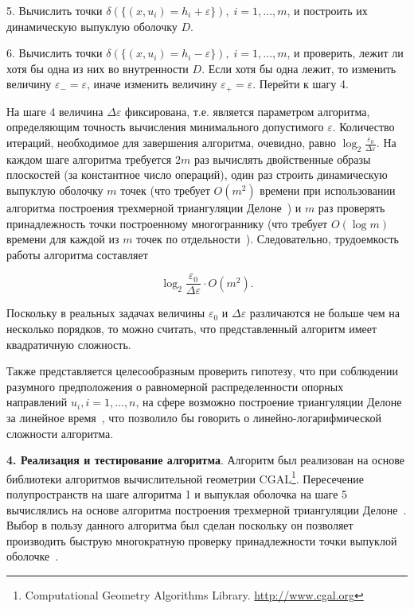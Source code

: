 \documentclass[a4paper, 11pt]{article}
\theoremstyle{MyDefinitionStyle}
\theoremstyle{MyTheoremStyle}
\begin{document}
5. Вычислить точки
 $\delta(\{(x, u_{i}) = h_{i} + \varepsilon\}), \; i = 1, \ldots, m$, и построить
 их динамическую выпуклую оболочку $D$.

6. Вычислить точки
 $\delta(\{(x, u_{i}) = h_{i} - \varepsilon\}), \; i = 1, \ldots, m$, и
 проверить, лежит ли хотя бы одна из них во внутренности $D$. Если хотя бы одна
 лежит, то изменить величину $\varepsilon_{-} = \varepsilon$, иначе изменить
 величину $\varepsilon_{+} = \varepsilon$. Перейти к шагу 4.


На шаге 4 величина $\Delta \varepsilon$ фиксирована, т.е. является
параметром алгоритма, определяющим точность вычисления минимального допустимого
$\varepsilon$. Количество итераций, необходимое для завершения алгоритма,
очевидно, равно $\log_{2} \frac{\varepsilon_{0}}{\Delta \varepsilon}$. На каждом
шаге алгоритма требуется $2m$ раз вычислять двойственные образы плоскостей (за
константное число операций), один раз строить динамическую выпуклую оболочку
$m$ точек (что требует $O(m^2)$ времени при использовании алгоритма
построения трехмерной триангуляции Делоне~\cite{Devillers}) и $m$ раз проверять
принадлежность точки построенному многограннику (что требует $O(\log m)$
времени для каждой из $m$ точек по отдельности~\cite{Devillers}).
Следовательно, трудоемкость работы алгоритма составляет

\begin{equation*}
 \log_{2} \frac{\varepsilon_{0}}{\Delta \varepsilon} \cdot O(m^2).
\end{equation*}

Поскольку в реальных задачах величины $\varepsilon_{0}$ и
$\Delta \varepsilon$ различаются не больше чем на несколько порядков, то
можно считать, что представленный алгоритм имеет квадратичную сложность.

Также представляется целесообразным проверить гипотезу, что при соблюдении
разумного предположения о равномерной распределенности опорных направлений
$u_i, i = 1, \ldots, n$, на сфере возможно построение триангуляции Делоне
за линейное время~\cite{Attali}, что позволило бы говорить о
линейно-логарифмической сложности алгоритма.

\textbf{4. Реализация и тестирование алгоритма}.
Алгоритм был реализован на основе библиотеки алгоритмов вычислительной
геометрии CGAL\footnote{Computational Geometry Algorithms Library.
\url{http://www.cgal.org}}.
Пересечение полупространств на шаге алгоритма 1 и выпуклая
оболочка на шаге 5 вычислялись на основе алгоритма построения трехмерной
триангуляции Делоне~\cite{Devillers}. Выбор в пользу данного алгоритма был
сделан поскольку он позволяет производить быструю многократную проверку
принадлежности точки выпуклой оболочке~\cite{Devillers}.
\end{document}
